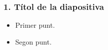 \documentclass[aspectratio=169]{beamer}
\newcommand{\caixatitol}[1]{%
  \begin{center}%
    \begin{caixadef}[titular]#1\end{caixadef}%
  \end{center}%
}
\newcommand{\solucio}[1]{{\color{margueVerdFosc}\mathbf{#1}}}
\begin{document}
\begin{frame}[t]
  \frametitle{1. Títol de la diapositiva}

  \begin{itemize}
    \item<1-> Primer punt.
    \item<2-> Segon punt.
  \end{itemize}






\end{frame}
\end{document}
